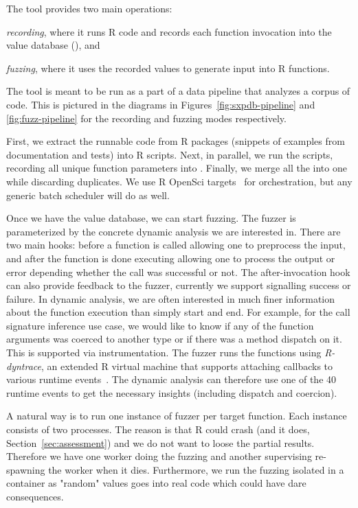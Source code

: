 \documentclass[sigplan,anonymous,review]{acmart}
\begin{document}
The tool provides two main operations:
%
\begin{inparaenum}[(1)]
\item \emph{recording}, where it runs R code and records each function invocation into the value database (\sxpdb), and
\item \emph{fuzzing}, where it uses the recorded values to generate input into R functions. 
\end{inparaenum}
%
The tool is meant to be run as a part of a data pipeline that analyzes a corpus of code.
This is pictured in the diagrams in Figures~\ref{fig:sxpdb-pipeline} and \ref{fig:fuzz-pipeline} for the recording and fuzzing modes respectively.

First, we extract the runnable code from R packages (snippets of examples from documentation and tests) into R scripts.
Next, in parallel, we run the scripts, recording all unique function parameters into \sxpdb.
Finally, we merge all the \sxpdb into one while discarding duplicates.
We use R OpenSci targets~\cite{landau2021_targets} for orchestration, but any generic batch scheduler will do as well.

Once we have the value database, we can start fuzzing.
The fuzzer is parameterized by the concrete dynamic analysis we are interested in.
There are two main hooks: before a function is called allowing one to preprocess the input, and after the function is done executing allowing one to process the output or error depending whether the call was successful or not.
The after-invocation hook can also provide feedback to the fuzzer, currently we support signalling success or failure.
In dynamic analysis, we are often interested in much finer information about the function execution than simply start and end.
For example, for the call signature inference use case, we would like to know if any of the function arguments was coerced to another type or if there was a method dispatch on it.
This is supported via instrumentation.
The fuzzer runs the functions using \emph{R-dyntrace}, an extended R virtual machine that supports attaching callbacks to various runtime events~\cite{goel2019}.
The dynamic analysis can therefore use one of the 40 runtime events to get the necessary insights (including dispatch and coercion).

A natural way is to run one instance of fuzzer per target function.
Each instance consists of two processes.
The reason is that R could crash (and it does, \Cf Section~\ref{sec:assessment}) and we do not want to loose the partial results.
Therefore we have one worker doing the fuzzing and another supervising re-spawning the worker when it dies.
Furthermore, we run the fuzzing isolated in a container as "random" values goes into real code which could have dare consequences.
\end{document}
